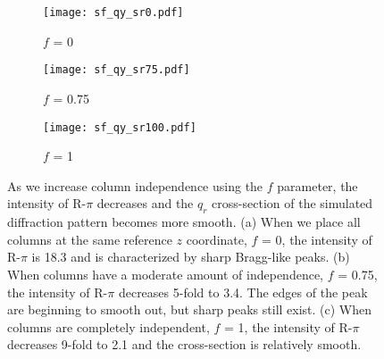   \begin{figure}
  \centering
  \begin{subfigure}{0.325\textwidth}
  \texttt{[image: sf\_qy\_sr0.pdf]}
  \caption{$f$ = 0}\label{fig:sf_qy_sr0}
  \end{subfigure}
  \begin{subfigure}{0.325\textwidth}
  \texttt{[image: sf\_qy\_sr75.pdf]}
  \caption{$f$ = 0.75}\label{fig:sf_qy_sr75}
  \end{subfigure}
  \begin{subfigure}{0.325\textwidth}
  \texttt{[image: sf\_qy\_sr100.pdf]}
  \caption{$f$ = 1}\label{fig:sf_qy_sr100}
  \end{subfigure}
  \caption{As we increase column independence using the $f$ parameter, the
	  intensity of R-$\pi$ decreases and the $q_r$ cross-section of the simulated
	  diffraction pattern becomes more smooth.  (a) When we place all columns at the
	  same reference $z$ coordinate, $f$ = 0, the intensity of R-$\pi$ is 18.3 and is
	  characterized by sharp Bragg-like peaks. (b) When columns have a moderate
	  amount of independence, $f$ = 0.75, the intensity of R-$\pi$ decreases 5-fold
	  to 3.4. The edges of the peak are beginning to smooth out, but sharp peaks
	  still exist. (c) When columns are completely independent, $f$ = 1, the
	  intensity of R-$\pi$ decreases 9-fold to 2.1 and the cross-section is
          relatively smooth.}\label{fig:column_displacement}
  \end{figure}


